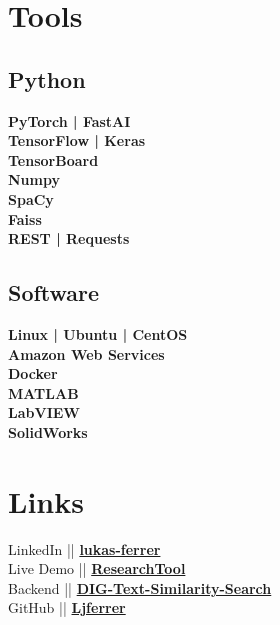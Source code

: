 \documentclass[letterpaper]{deedy-resume} %
\begin{document}
\begin{minipage}[t]{0.33\textwidth}
\sectionspace %


\section{Tools}

\subsection{Python}
{\bf PyTorch | FastAI} \\
{\bf TensorFlow | Keras} \\
{\bf TensorBoard} \\ 
{\bf Numpy} \\ 
{\bf SpaCy} \\ 
{\bf Faiss} \\ 
{\bf REST | Requests} \\

\sectionspace %

\subsection{Software}
{\bf Linux | Ubuntu | CentOS} \\
{\bf Amazon Web Services} \\
{\bf Docker} \\
{\bf MATLAB} \\
{\bf LabVIEW} \\
{\bf SolidWorks} \\

\sectionspace %


\section{Links} 
\location{}     %
{LinkedIn || \href{https://www.linkedin.com/in/lukas-ferrer-9596a410b}{\bf lukas-ferrer}} \\
{Live Demo || \href{http://54.153.12.18/research-tool/?referrer=rct&id=UXVlc3Rpb25Ob2RlOjMxMA==&token=eyJ0eXAiOiJKV1QiLCJhbGciOiJIUzI1NiJ9.eyJ1c2VyX2lkIjoxODExLCJ1c2VybmFtZSI6ImFkbWluIiwiZXhwIjoxNTYxODE3NTMzLCJlbWFpbCI6InNhZ2VAaXNpLmVkdSJ9.bFMd1C0R938hAJic-gzNEXTfI1bpZZW_VusjpXAommg}{\bf ResearchTool}} \\
{Backend || \href{https://github.com/usc-isi-i2/dig-text-similarity-search}{\bf DIG-Text-Similarity-Search}} \\
{GitHub || \href{https://github.com/Ljferrer}{\bf Ljferrer}} \\



\end{minipage}
\end{document}
